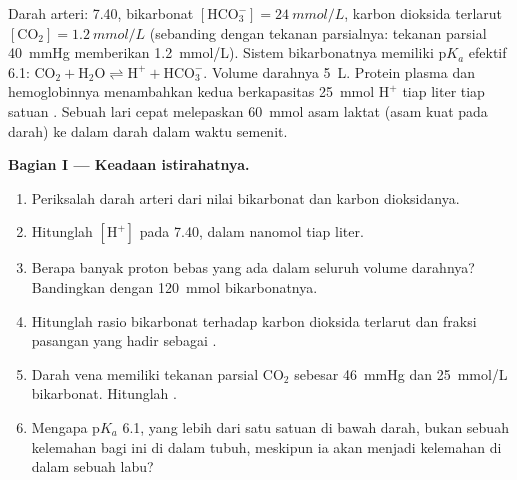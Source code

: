 \begin{problem}
\label{pb:b1:water-small-molecules:1}
Darah arteri:  7.40, bikarbonat $[\mathrm{HCO_3^-}] =
\qty{24}{mmol/L}$, karbon dioksida terlarut $[\mathrm{CO_2}] =
\qty{1.2}{mmol/L}$ (sebanding dengan tekanan parsialnya: tekanan
parsial \qty{40}{mmHg} memberikan \qty{1.2}{mmol/L}). Sistem
bikarbonatnya memiliki p$K_a$ efektif 6.1: $\mathrm{CO_2} + \mathrm{H_2O}
\rightleftharpoons \mathrm{H^+} + \mathrm{HCO_3^-}$. Volume darahnya
\qty{5}{L}. Protein plasma dan hemoglobinnya menambahkan 
kedua berkapasitas \qty{25}{mmol} $\mathrm{H^+}$ tiap liter tiap satuan
. Sebuah lari cepat melepaskan \qty{60}{mmol} asam laktat (asam kuat
pada  darah) ke dalam darah dalam waktu semenit.

\medskip
\noindent\textbf{Bagian I --- Keadaan istirahatnya.}
\begin{enumerate}
  \item Periksalah  darah arteri dari nilai bikarbonat dan karbon
        dioksidanya.
  \item Hitunglah $[\mathrm{H^+}]$ pada  7.40, dalam nanomol tiap
        liter.
  \item Berapa banyak proton bebas yang ada dalam seluruh volume
        darahnya? Bandingkan dengan \qty{120}{mmol} bikarbonatnya.
  \item Hitunglah rasio bikarbonat terhadap karbon dioksida terlarut
        dan fraksi pasangan  yang hadir sebagai .
  \item Darah vena memiliki tekanan parsial $\mathrm{CO_2}$ sebesar
        \qty{46}{mmHg} dan \qty{25}{mmol/L} bikarbonat. Hitunglah
        .
  \item Mengapa p$K_a$ 6.1, yang lebih dari satu satuan di bawah 
        darah, bukan sebuah kelemahan bagi  ini di dalam
        tubuh, meskipun ia akan menjadi kelemahan di dalam sebuah labu?
\end{enumerate}


\end{problem}
